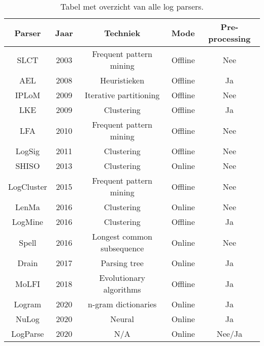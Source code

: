 \begin{table}[!htp]
    \caption{Tabel met overzicht van alle log parsers.}
    \label{table:parserssamenvatting}
    \begin{center}
        \begin{tabular}{||c | c | c | c | c||} 
            \hline
            Parser & Jaar & Techniek & Mode & Pre-processing \\ [0.5ex] 
            \hline\hline
            SLCT & 2003 & Frequent pattern mining & Offline & Nee \\
            
            AEL & 2008 & Heuristieken & Offline & Ja \\ 

            IPLoM & 2009 & Iterative partitioning & Offline & Nee \\

            LKE & 2009 & Clustering & Offline & Ja \\

            LFA & 2010 & Frequent pattern mining & Offline & Nee \\

            LogSig & 2011 & Clustering & Offline & Nee \\

            SHISO & 2013 & Clustering & Online & Nee \\

            LogCluster & 2015 & Frequent pattern mining & Offline & Nee \\

            LenMa & 2016 & Clustering & Online & Nee \\

            LogMine & 2016 & Clustering & Offline & Ja \\

            Spell & 2016 & Longest common subsequence & Online & Nee \\

            Drain & 2017 & Parsing tree & Online & Ja \\
            
            MoLFI & 2018 & Evolutionary algorithms & Offline & Ja \\
            
            Logram & 2020 & n-gram dictionaries & Online & Ja \\
            
            NuLog & 2020 & Neural & Online & Ja \\
            
            LogParse & 2020 & N/A & Online & Nee/Ja \\
            \hline
        \end{tabular}
    \end{center}
\end{table}
